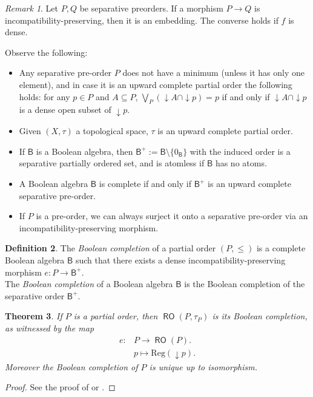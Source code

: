 \documentclass[11pt]{amsart}
\theoremstyle{plain}
\newtheorem{theorem}{Theorem}[section]
\theoremstyle{definition}
\newtheorem{definition}[theorem]{Definition}
\theoremstyle{plain}
\theoremstyle{remark}
\newtheorem{remark}[theorem]{Remark}
\DeclareMathOperator{\RO}{\mathsf{RO}}
\newcommand{\bool}[1]{\mathsf{#1}}
\newcommand{\Reg}[1]{\mathrm{Reg}\left(#1\right)}
\newcommand{\0}{\mathsf{0}}
\renewcommand{\1}{\mathsf{1}}
\renewcommand{\2}{\mathsf{2}}
\theoremstyle{definition}
\begin{document}
\begin{remark}
Let $P, Q$ be separative preorders. If a morphism $P\to Q$ is incompatibility-preserving, then it is an embedding. The converse holds if $f$ is dense.
\end{remark}

Observe the following:
\begin{itemize}
\item Any separative pre-order $P$ does not have a minimum (unless it has only one element), and in case it is an upward complete partial order the following holds: for any $p\in P$ and $A\subseteq P$, $\bigvee_P(\downarrow A\cap \downarrow p)=p$ if and only if 
$\downarrow A\cap\downarrow p$ is a dense open subset of $\downarrow p$.
\item Given $(X,\tau)$ a topological space, $\tau$ is an upward complete partial order.
\item If $\bool{B}$ is a Boolean algebra, then $\bool{B}^+:=\bool{B}\setminus\{0_\bool{B}\}$ with the induced order is a separative partially ordered set, and is atomless if $\bool{B}$ has no atoms.
\item A Boolean algebra $\bool{B}$ is complete if and only if $\bool{B}^+$ is an upward complete separative pre-order.
\item If $P$ is a pre-order, we can always surject it onto a separative pre-order via an incompatibility-preserving morphism.
\end{itemize}
\begin{definition}
The \emph{Boolean completion} of a partial order $(P,\leq)$ is a complete Boolean algebra $\bool{B}$ such that
there exists a dense incompatibility-preserving morphism $e:P\to \bool{B}^+$.\\
 The \emph{Boolean completion} of a Boolean algebra $\bool{B}$ is the Boolean completion of the separative order $\bool{B}^+$.
\end{definition}
\begin{theorem}
\label{boo:com}
If $P$ is a partial order, then $\RO(P,\tau_P)$ 
is its Boolean completion, as witnessed by the map 
\[
\begin{aligned}
e:&P\to\RO(P).\\
&p\mapsto \Reg{\downarrow p}.
\end{aligned}
\]
Moreover the Boolean completion of $P$ is unique up to isomorphism.
\end{theorem}
\begin{proof}
See the proof of \cite[Theorem 14.10]{JECH} or \cite[Theorem 4.2.4]{viale-bookonforcing}.
\end{proof}
\end{document}
